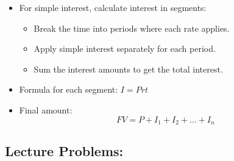 \documentclass[
]{book}
\providecommand{\tightlist}{%
  \setlength{\itemsep}{0pt}\setlength{\parskip}{0pt}}
\begin{document}
\begin{enumerate}
  \begin{itemize}
  \tightlist
  \item
    For simple interest, calculate interest in segments:

    \begin{itemize}
    \tightlist
    \item
      Break the time into periods where each rate applies.
    \item
      Apply simple interest separately for each period.
    \item
      Sum the interest amounts to get the total interest.
    \end{itemize}
  \item
    Formula for each segment: \(I = Prt\)
  \item
    Final amount:
    \[
     FV = P + I_1 + I_2 + \ldots + I_n
     \]
  \end{itemize}
\end{enumerate}

\subsection*{Lecture Problems:}\label{lecture-problems-8}
\end{document}
